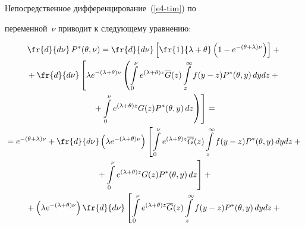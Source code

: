     

    Непосредственное дифференцирование~(\ref{e4-tim}) по 

переменной~$\nu$ приводит к следующему уравнению:

    \begin{multline*}

    \fr{d}{d\nu}\,P^*(\theta,\nu) =\fr{d}{d\nu} \left[ \fr{1}{\lambda+\theta} 

\left( 1-e^{-(\theta+\lambda)\nu}\right)\right] +{}\\

    {}+ \fr{d}{d\nu}\left[ \lambda e^{-(\lambda+\theta)\nu} \left( \int\limits_0^\nu 

e^{(\lambda+\theta)z} \overline{G}(z) \int\limits_z^\infty f(y-z) P^*(\theta,y)\,dydz 

+ {}\right.\right.\\

\left.\left.{}+\int\limits_0^\nu e^{(\lambda+\theta)z} G(z) P^*(\theta,y)\,dz\right)\right]={}\\

    {}=

    e^{-(\theta+\lambda)\nu}+ \fr{d}{d\nu} \left( \lambda e^{-

(\lambda+\theta)\nu}\right) \left[ \int\limits_0^\nu e^{(\lambda+\theta)z}\overline{G} 

(z) \int\limits_z^\infty f(y-z) P^*(\theta,y)\,dy dz+{}\right.\\

    \left.{}+\int\limits_0^\nu e^{(\lambda+\theta)z} G(z) P^*(\theta,y)\,dz\right]+ {}\\

    {}+

\left( \lambda e^{-(\lambda+\theta)\nu}\right) \fr{d}{d\nu} \left[  \int\limits_0^\nu 

e^{(\lambda+\theta)z} \overline{G}(z) \int\limits_z^\infty f(y-z) P^*(\theta,y)\,dy 

dz+ {}\right.

    \end{multline*}

    

\noindent

